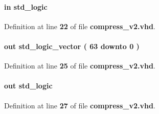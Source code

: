 \paragraph[{data\+\_\+in\+\_\+valid}]{ {\bfseries \textcolor{keywordflow}{in}\textcolor{vhdlchar}{ }} {\bfseries \textcolor{comment}{std\+\_\+logic}\textcolor{vhdlchar}{ }} \hspace{0.3cm}{\ttfamily [Port]}}\label{classcompress__v2_a9fe0a9f38dccdb91d670106b4bbac6fd}


Definition at line {\bf 22} of file {\bf compress\+\_\+v2.\+vhd}.

\paragraph[{data\+\_\+out}]{ {\bfseries \textcolor{keywordflow}{out}\textcolor{vhdlchar}{ }} {\bfseries \textcolor{comment}{std\+\_\+logic\+\_\+vector}\textcolor{vhdlchar}{ }\textcolor{vhdlchar}{(}\textcolor{vhdlchar}{ }\textcolor{vhdlchar}{ } \textcolor{vhdldigit}{63} \textcolor{vhdlchar}{ }\textcolor{keywordflow}{downto}\textcolor{vhdlchar}{ }\textcolor{vhdlchar}{ } \textcolor{vhdldigit}{0} \textcolor{vhdlchar}{ }\textcolor{vhdlchar}{)}\textcolor{vhdlchar}{ }} \hspace{0.3cm}{\ttfamily [Port]}}\label{classcompress__v2_a0fa91e9dfc077bf2f38bc5d8f13d0d4f}


Definition at line {\bf 25} of file {\bf compress\+\_\+v2.\+vhd}.

\paragraph[{data\+\_\+out\+\_\+valid}]{ {\bfseries \textcolor{keywordflow}{out}\textcolor{vhdlchar}{ }} {\bfseries \textcolor{comment}{std\+\_\+logic}\textcolor{vhdlchar}{ }} \hspace{0.3cm}{\ttfamily [Port]}}\label{classcompress__v2_a465c1d9247590540abb6db12f657556f}


Definition at line {\bf 27} of file {\bf compress\+\_\+v2.\+vhd}.

